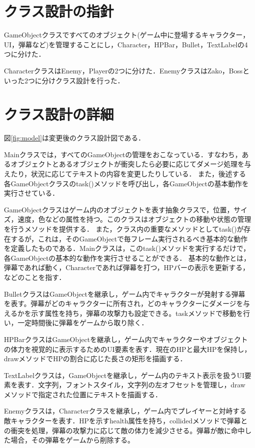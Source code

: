 \documentclass[dvipdfmx]{jlreq}
\begin{document}
\section{クラス設計の指針}
GameObjectクラスですべてのオブジェクト(ゲーム中に登場するキャラクター，UI，弾幕など)を管理することにし，Character，HPBar，Bullet，TextLabelの4つに分けた．

CharacterクラスはEnemy，Playerの2つに分けた．EnemyクラスはZako，Bossといった2つに分けクラス設計を行った．

\section{クラス設計の詳細}\label{sec:class}
図\ref{fig:model}は変更後のクラス設計図である．

Mainクラスでは，すべてのGameObjectの管理をおこなっている．すなわち，あるオブジェクトとあるオブジェクトが衝突したら必要に応じてダメージ処理を与えたり，状況に応じてテキストの内容を変更したりしている．
また，後述する各GameObjectクラスのtask()メソッドを呼び出し，各GameObjectの基本動作を実行させている．

GameObjectクラスはゲーム内のオブジェクトを表す抽象クラスで，位置，サイズ，速度，色などの属性を持つ。このクラスはオブジェクトの移動や状態の管理を行うメソッドを提供する．
また，クラス内の重要なメソッドとしてtask()が存在するが，これは，そのGameObjectで毎フレーム実行されるべき基本的な動作を定義したものである．Mainクラスは，このtask()メソッドを実行するだけで，各GameObjectの基本的な動作を実行させることができる．
基本的な動作とは，弾幕であれば動く，Characterであれば弾幕を打つ，HPバーの表示を更新する，などのことを指す．

BulletクラスはGameObjectを継承し，ゲーム内でキャラクターが発射する弾幕を表す。弾幕がどのキャラクターに所有され，どのキャラクターにダメージを与えるかを示す属性を持ち，弾幕の攻撃力も設定できる。taskメソッドで移動を行い，一定時間後に弾幕をゲームから取り除く．

HPBarクラスはGameObjectを継承し，ゲーム内でキャラクターやオブジェクトの体力を視覚的に表示するためのUI要素を表す．現在のHPと最大HPを保持し，drawメソッドでHPの割合に応じた長さの矩形を描画する．

TextLabelクラスは，GameObjectを継承し，ゲーム内のテキスト表示を扱うUI要素を表す．文字列，フォントスタイル，文字列の左オフセットを管理し，draw メソッドで指定された位置にテキストを描画する．

Enemyクラスは，Characterクラスを継承し，ゲーム内でプレイヤーと対峙する敵キャラクターを表す．HPを示すhealth属性を持ち，collidedメソッドで弾幕との衝突を処理，弾幕の攻撃力に応じて敵の体力を減少させる。弾幕が敵に命中した場合，その弾幕をゲームから削除する。
\end{document}
